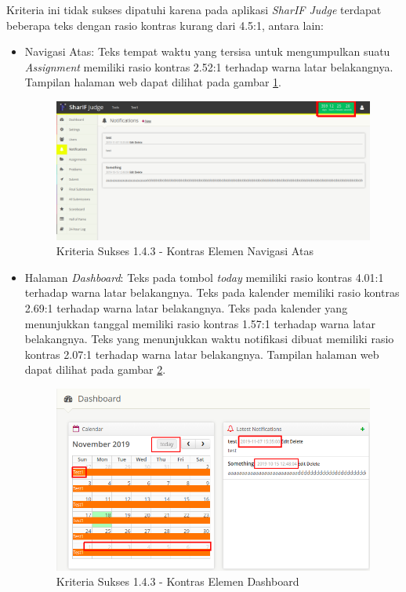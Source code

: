\documentclass[a4paper,twoside]{article}
\begin{document}
\begin{enumerate}
		Kriteria ini tidak sukses dipatuhi karena pada aplikasi \textit{SharIF Judge} terdapat beberapa teks dengan rasio kontras kurang dari 4.5:1, antara lain:
		\begin{itemize}
			\item Navigasi Atas: Teks tempat waktu yang tersisa untuk mengumpulkan suatu \textit{Assignment} memiliki rasio kontras 2.52:1 terhadap warna latar belakangnya. Tampilan halaman web dapat dilihat pada gambar \ref{fig:kepatuhan_1_4_3_navigasi_atas}.
			\begin{figure}[H]
				\centering  
				\includegraphics[scale=0.25]{kepatuhan_1_4_3_navigasi_atas}  
				\caption[Kriteria Sukses 1.4.3 - Kontras Elemen Navigasi Atas]{Kriteria Sukses 1.4.3 - Kontras Elemen Navigasi Atas} 
				\label{fig:kepatuhan_1_4_3_navigasi_atas} 
			\end{figure}
			
			\item Halaman \textit{Dashboard}: Teks pada tombol \textit{today} memiliki rasio kontras 4.01:1 terhadap warna latar belakangnya. Teks pada kalender memiliki rasio kontras 2.69:1 terhadap warna latar belakangnya. Teks pada kalender yang menunjukkan tanggal memiliki rasio kontras 1.57:1 terhadap warna latar belakangnya. Teks yang menunjukkan waktu notifikasi dibuat memiliki rasio kontras 2.07:1 terhadap warna latar belakangnya. Tampilan halaman web dapat dilihat pada gambar \ref{fig:kepatuhan_1_4_3_dashboard}.
			\begin{figure}[H]
				\centering  
				\includegraphics[scale=0.5]{kepatuhan_1_4_3_dashboard}  
				\caption[Kriteria Sukses 1.4.3 - Kontras Elemen Dashboard]{Kriteria Sukses 1.4.3 - Kontras Elemen Dashboard} 
				\label{fig:kepatuhan_1_4_3_dashboard} 
			\end{figure}
			

\end{itemize}
\end{enumerate}
\end{document}
